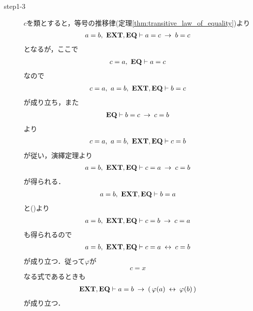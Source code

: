 \begin{sketch}
\begin{description}
			\item[step1-3]
				$c$を類とすると，等号の推移律(定理\ref{thm:transitive_law_of_equality})より
				\begin{align}
					a = b,\ \mbox{{\bf EXT}},\mbox{{\bf EQ}} \vdash a = c \hspace{0.25em}\rightarrow\hspace{0.25em} b = c
				\end{align}
				となるが，ここで
				\begin{align}
					c = a,\ \mbox{{\bf EQ}} \vdash a = c
				\end{align}
				なので
				\begin{align}
					c = a,\ a = b,\ \mbox{{\bf EXT}},\mbox{{\bf EQ}} \vdash b = c
				\end{align}
				が成り立ち，また
				\begin{align}
					\mbox{{\bf EQ}} \vdash b = c \hspace{0.25em}\rightarrow\hspace{0.25em} c = b
				\end{align}
				より
				\begin{align}
					c = a,\ a = b,\ \mbox{{\bf EXT}},\mbox{{\bf EQ}} \vdash c = b
				\end{align}
				が従い，演繹定理より
				\begin{align}
					a = b,\ \mbox{{\bf EXT}},\mbox{{\bf EQ}} \vdash c = a \hspace{0.25em}\rightarrow\hspace{0.25em} c = b
					\label{fom:the_principle_of_substitution_1}
				\end{align}
				が得られる．
				\begin{align}
					a = b,\ \mbox{{\bf EXT}},\mbox{{\bf EQ}} \vdash b = a
				\end{align}
				と()より
				\begin{align}
					a = b,\ \mbox{{\bf EXT}},\mbox{{\bf EQ}} \vdash c = b \hspace{0.25em}\rightarrow\hspace{0.25em} c = a
				\end{align}
				も得られるので
				\begin{align}
					a = b,\ \mbox{{\bf EXT}},\mbox{{\bf EQ}} \vdash c = a \hspace{0.25em}\leftrightarrow\hspace{0.25em} c = b
				\end{align}
				が成り立つ．従って$\varphi$が
				\begin{align}
					c = x
				\end{align}
				なる式であるときも
				\begin{align}
					\mbox{{\bf EXT}},\mbox{{\bf EQ}} \vdash a = b \hspace{0.25em}\rightarrow\hspace{0.25em} (\, \varphi(a) \hspace{0.25em}\leftrightarrow\hspace{0.25em} \varphi(b)\, )
				\end{align}
				が成り立つ．
			

\end{description}
\end{sketch}
